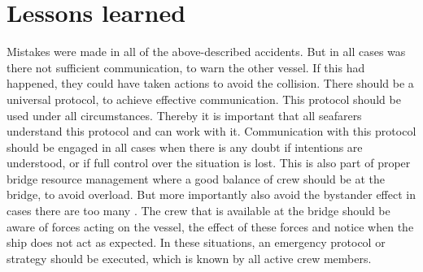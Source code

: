 \section{Lessons learned}
Mistakes were made in all of the above-described accidents. But in all cases was there not sufficient communication, to warn the other vessel. If this had happened, they could have taken actions to avoid the collision. There should be a universal protocol, to achieve effective communication. This protocol should be used under all circumstances. Thereby it is important that all seafarers understand this protocol and can work with it. Communication with this protocol should be engaged in all cases when there is any doubt if intentions are understood, or if full control over the situation is lost. This is also part of proper bridge resource management where a good balance of crew should be at the bridge, to avoid overload. But more importantly also avoid the bystander effect in cases there are too many \cite{Fischer2011}. The crew that is available at the bridge should be aware of forces acting on the vessel, the effect of these forces and notice when the ship does not act as expected. In these situations, an emergency protocol or strategy should be executed, which is known by all active crew members. 
